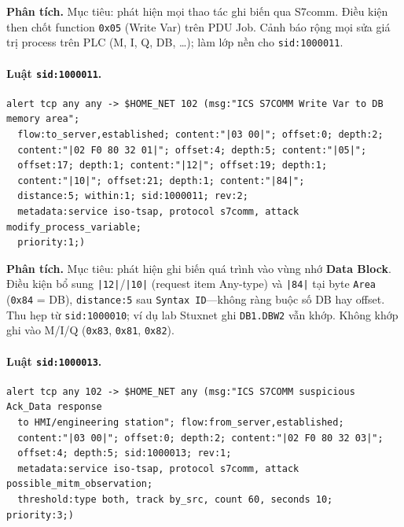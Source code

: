 \documentclass[../main.tex]{subfiles}
\begin{document}
\noindent\textbf{Phân tích.}
Mục tiêu: phát hiện mọi thao tác ghi biến qua S7comm. Điều kiện then chốt function \texttt{0x05} (Write Var) trên PDU Job. Cảnh báo rộng mọi sửa giá trị process trên PLC (M, I, Q, DB, \ldots); làm lớp nền cho \texttt{sid:1000011}.

\paragraph{Luật \texttt{sid:1000011}.}
\begin{footnotesize}
\begin{verbatim}
alert tcp any any -> $HOME_NET 102 (msg:"ICS S7COMM Write Var to DB memory area";
  flow:to_server,established; content:"|03 00|"; offset:0; depth:2;
  content:"|02 F0 80 32 01|"; offset:4; depth:5; content:"|05|";
  offset:17; depth:1; content:"|12|"; offset:19; depth:1;
  content:"|10|"; offset:21; depth:1; content:"|84|";
  distance:5; within:1; sid:1000011; rev:2;
  metadata:service iso-tsap, protocol s7comm, attack modify_process_variable;
  priority:1;)
\end{verbatim}
\end{footnotesize}

\noindent\textbf{Phân tích.}
Mục tiêu: phát hiện ghi biến quá trình vào vùng nhớ \textbf{Data Block}. Điều kiện bổ sung \texttt{|12|}/\texttt{|10|} (request item Any-type) và \texttt{|84|} tại byte \texttt{Area} (\texttt{0x84} = DB), \texttt{distance:5} sau \texttt{Syntax ID}---không ràng buộc số DB hay offset. Thu hẹp từ \texttt{sid:1000010}; ví dụ lab Stuxnet ghi \texttt{DB1.DBW2} vẫn khớp. Không khớp ghi vào M/I/Q (\texttt{0x83}, \texttt{0x81}, \texttt{0x82}).

\paragraph{Luật \texttt{sid:1000013}.}
\begin{footnotesize}
\begin{verbatim}
alert tcp any 102 -> $HOME_NET any (msg:"ICS S7COMM suspicious Ack_Data response
  to HMI/engineering station"; flow:from_server,established;
  content:"|03 00|"; offset:0; depth:2; content:"|02 F0 80 32 03|";
  offset:4; depth:5; sid:1000013; rev:1;
  metadata:service iso-tsap, protocol s7comm, attack possible_mitm_observation;
  threshold:type both, track by_src, count 60, seconds 10; priority:3;)
\end{verbatim}
\end{footnotesize}
\end{document}
